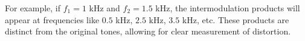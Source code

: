 For example, if \( f_1 = 1 \) kHz and \( f_2 = 1.5 \) kHz, the intermodulation products will appear at frequencies like \( 0.5 \) kHz, \( 2.5 \) kHz, \( 3.5 \) kHz, etc. These products are distinct from the original tones, allowing for clear measurement of distortion.

